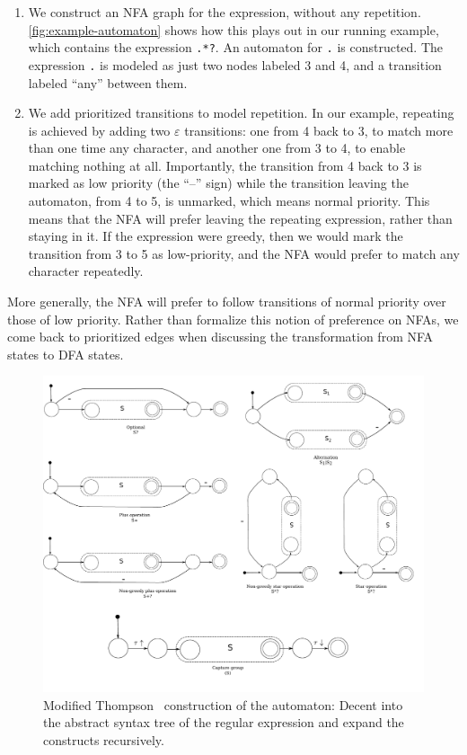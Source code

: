 \documentclass[english]{sigplanconf}
\theoremstyle{definition}
\begin{document}
\begin{enumerate}
\item We construct an NFA graph for the expression, without any repetition.  
\autoref{fig:example-automaton} shows how this plays out in our running example, which contains the expression \texttt{.*?}. An automaton for \texttt{.} is constructed. The expression \texttt{.} is modeled as just two nodes labeled 3 and 4, and a transition labeled ``any''
between them.  

\item We add prioritized transitions to model repetition. In our example, repeating is achieved by adding two $\varepsilon$
transitions: one from 4 back to 3, to match more than one time any
character, and another one from 3 to 4, to enable matching nothing
at all.  Importantly, the transition from 4 back to 3 is marked as
low priority (the ``--'' sign) while the transition leaving the automaton, from 4
to 5, is unmarked, which means normal priority.  This means that
the NFA will prefer leaving the repeating expression, rather than
staying in it.  If the expression were greedy, then we would mark
the transition from 3 to 5 as low-priority, and the NFA would prefer
to match any character repeatedly. 

\end{enumerate}



More generally, the NFA will prefer to follow transitions of normal
priority over those of low priority. Rather than formalize this
notion of preference on NFAs, we come back to prioritized edges when
discussing the transformation from NFA states to DFA states.

\begin{figure}[tb] \includegraphics[width=\linewidth]{graphs/thompson}
\caption{Modified Thompson~\cite{Thom68a} construction of the
automaton: Decent into the abstract syntax tree of the regular
expression and expand the constructs recursively.}
\label{fig:thompson-construction} 
\end{figure}
\end{document}
